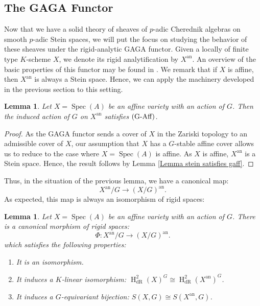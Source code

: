 \documentclass{amsart}
\newtheorem{Lemma}[defi]{Lemma}
\newcommand{\Spec}{\operatorname{Spec}}
\begin{document}
\subsection{\texorpdfstring{The GAGA Functor}{}}\label{Section GAGA}
Now that we have a solid theory of sheaves of $p$-adic Cherednik algebras on smooth $p$-adic Stein spaces, we will put the focus on studying the behavior of these sheaves under the rigid-analytic GAGA functor. Given a locally of finite type $K$-scheme $X$, we denote its rigid analytification by $X^{\operatorname{an}}$. An overview of the basic properties of this functor may be found in  \cite[5.4]{bosch2014lectures}. We remark that if $X$ is affine, then $X^{\operatorname{an}}$ is always a Stein space. Hence, we can apply the machinery developed in the previous section to this setting.
\begin{Lemma}\label{GAGA and quotients}
Let $X=\Spec(A)$ be an affine variety with an action of $G$. Then the induced action of $G$ on  $X^{\operatorname{an}}$ satisfies $\textnormal{(G-Aff)}$. 
\end{Lemma}
\begin{proof}
As the GAGA functor sends a cover of $X$ in the Zariski topology to an admissible cover of $X$, our assumption that  $X$ has a $G$-stable affine cover allows us to reduce to the case where 
$X=\Spec(A)$ is affine. As $X$ is affine, $X^{\operatorname{an}}$ is a Stein space. Hence, the result follows by Lemma \ref{Lemma stein satisfies gaff}.
\end{proof}
Thus, in the situation of the previous lemma, we have a canonical map:
\begin{equation*}
    X^{\operatorname{an}}/G\rightarrow (X/G)^{\operatorname{an}}.
\end{equation*}
As expected, this map is always an isomorphism of rigid spaces:
\begin{Lemma}
 Let $X=\Spec(A)$ be an affine variety with an action of $G$. There is a canonical morphism of rigid spaces:
 \begin{equation*}
     \Phi:X^{\operatorname{an}}/G\rightarrow (X/G)^{\operatorname{an}}.
 \end{equation*}
which satisfies the following properties:
\begin{enumerate}[label=(\roman*)]
    \item It is an isomorphism.
    \item It induces a $K$-linear isomorphism: $\operatorname{H}_{\operatorname{dR}}^2(X)^G\cong\operatorname{H}_{\operatorname{dR}}^2(X^{\operatorname{an}})^G$.
    \item  It induces a $G$-equivariant bijection: $S(X,G) \cong S(X^{\operatorname{an}},G)$.
\end{enumerate}
\end{Lemma}
\end{document}

